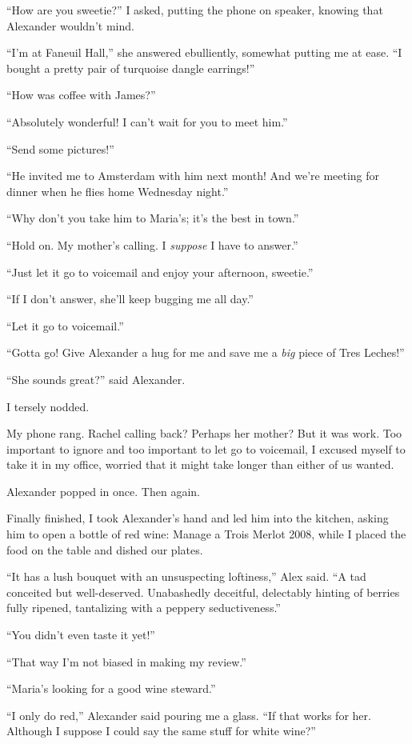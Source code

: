 ``How are you sweetie?'' I asked, putting the phone on speaker, knowing
that Alexander wouldn't mind.

``I'm at Faneuil Hall,'' she answered ebulliently, somewhat putting me
at ease. ``I bought a pretty pair of turquoise dangle earrings!''

``How was coffee with James?''

``Absolutely wonderful! I can't wait for you to meet him.''

``Send some pictures!''

``He invited me to Amsterdam with him next month! And we're meeting for
dinner when he flies home Wednesday night.''

``Why don't you take him to Maria's; it's the best in town.''

``Hold on. My mother's calling. I \emph{suppose} I have to answer.''

``Just let it go to voicemail and enjoy your afternoon, sweetie.''

``If I don't answer, she'll keep bugging me all day.''

``Let it go to voicemail.''

``Gotta go! Give Alexander a hug for me and save me a \emph{big} piece
of Tres Leches!''

``She sounds great?'' said Alexander.

I tersely nodded.

My phone rang. Rachel calling back? Perhaps her mother? But it was work.
Too important to ignore and too important to let go to voicemail, I
excused myself to take it in my office, worried that it might take
longer than either of us wanted.

Alexander popped in once. Then again.

Finally finished, I took Alexander's hand and led him into the kitchen,
asking him to open a bottle of red wine: Manage a Trois Merlot 2008,
while I placed the food on the table and dished our plates.

``It has a lush bouquet with an unsuspecting loftiness,'' Alex said. ``A
tad conceited but well-deserved. Unabashedly deceitful, delectably
hinting of berries fully ripened, tantalizing with a peppery
seductiveness.''

``You didn't even taste it yet!''

``That way I'm not biased in making my review.''

``Maria's looking for a good wine steward.''

``I only do red,'' Alexander said pouring me a glass. ``If that works
for her. Although I suppose I could say the same stuff for white wine?''

